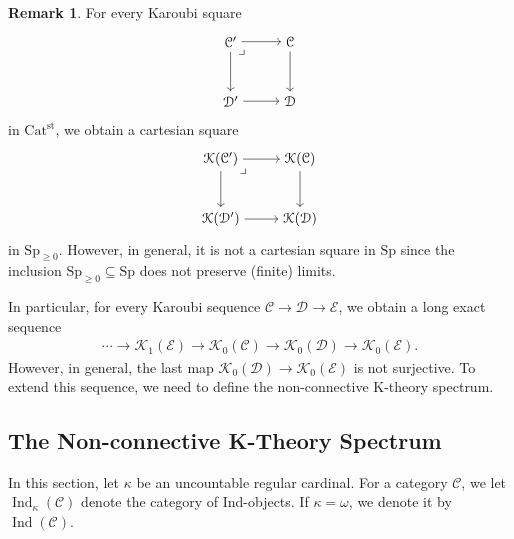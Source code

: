 \documentclass[a4paper,dvipdfmx,11pt,reqno]{amsart}
\newcommand{\C}{\mathcal{C}}
\newcommand{\D}{\mathcal{D}}
\newcommand{\E}{\mathcal{E}}
\newcommand{\K}{\mathcal{K}}
\DeclareMathOperator{\Ind}{Ind}
\newcommand{\Catst}{\mathrm{Cat^{st}}}
\newcommand{\Sp}{\mathrm{Sp}}
\theoremstyle{definition}
\newtheorem{remark}[theorem]{Remark}
\begin{document}
\begin{remark}
  For every Karoubi square 
  \[\begin{tikzpicture}[auto,->] 
    \node (tl) at (0,1.5) {$\C'$}; 
    \node (tr) at (1.5,1.5) {$\C$};
    \node (bl) at (0,0) {$\D'$}; 
    \node (br) at (1.5,0) {$\D$}; 
    \draw (tl) -- node {} (tr); 
    \draw (bl) -- node[swap] {} (br); 
    \draw (tl) -- node[swap] {} (bl);
    \draw (tr) -- node {} (br);
    \node at (tl.south east) {$\lrcorner$}; 
  \end{tikzpicture}\]
  in $\Catst$, we obtain a cartesian square
  \[\begin{tikzpicture}[auto,->] 
    \node (tl) at (0,1.5) {$\K(\C')$}; 
    \node (tr) at (2,1.5) {$\K(\C)$};
    \node (bl) at (0,0) {$\K(\D')$}; 
    \node (br) at (2,0) {$\K(\D)$}; 
    \draw (tl) -- node {} (tr); 
    \draw (bl) -- node[swap] {} (br); 
    \draw (tl) -- node[swap] {} (bl);
    \draw (tr) -- node {} (br); 
    \node at (tl.south east) {$\lrcorner$};
  \end{tikzpicture}\]
  in $\Sp_{\geq 0}$.
  However, in general, it is not a cartesian square in $\Sp$ since the inclusion $\Sp_{\geq 0} \subseteq \Sp$ does not preserve (finite) limits.

  In particular, for every Karoubi sequence $\C \to \D \to \E$, we obtain a long exact sequence
  \begin{align*}
    \cdots \to \K_1(\E) \to \K_0(\C) \to \K_0(\D) \to \K_0(\E).
  \end{align*}
  However, in general, the last map $\K_0(\D) \to \K_0(\E)$ is not surjective.
  To extend this sequence, we need to define the non-connective K-theory spectrum.
\end{remark}

\subsection{The Non-connective K-Theory Spectrum}

In this section, let $\kappa$ be an uncountable regular cardinal.
For a category $\C$, we let $\Ind_{\kappa}(\C)$ denote the category of Ind-objects.
If $\kappa=\omega$, we denote it by $\Ind(\C)$.
\end{document}
